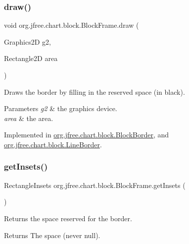 \subsubsection{\texorpdfstring{draw()}{draw()}}
{\footnotesize\ttfamily void org.\+jfree.\+chart.\+block.\+Block\+Frame.\+draw (\begin{DoxyParamCaption}\item[{Graphics2D}]{g2,  }\item[{Rectangle2D}]{area }\end{DoxyParamCaption})}

Draws the border by filling in the reserved space (in black).


\begin{DoxyParams}{Parameters}
{\em g2} & the graphics device. \\
\hline
{\em area} & the area. \\
\hline
\end{DoxyParams}


Implemented in \mbox{\hyperlink{classorg_1_1jfree_1_1chart_1_1block_1_1_block_border_af76639888de7329092e0432ad264ada6}{org.\+jfree.\+chart.\+block.\+Block\+Border}}, and \mbox{\hyperlink{classorg_1_1jfree_1_1chart_1_1block_1_1_line_border_aabedc62e5a7d7b03629c6406a8e7541e}{org.\+jfree.\+chart.\+block.\+Line\+Border}}.

\mbox{\label{interfaceorg_1_1jfree_1_1chart_1_1block_1_1_block_frame_ae85aa6f391781ca53ae5b4671b6d1154}} 
\subsubsection{\texorpdfstring{get\+Insets()}{getInsets()}}
{\footnotesize\ttfamily Rectangle\+Insets org.\+jfree.\+chart.\+block.\+Block\+Frame.\+get\+Insets (\begin{DoxyParamCaption}{ }\end{DoxyParamCaption})}

Returns the space reserved for the border.

\begin{DoxyReturn}{Returns}
The space (never {\ttfamily null}). 
\end{DoxyReturn}


